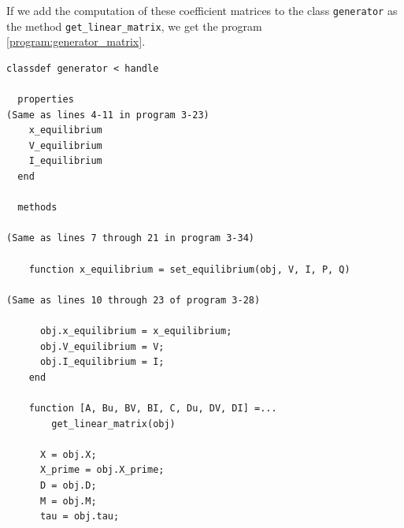 \documentclass[tombow,dvipdfmx]{corona-a5-1.1}
\begin{document}
\begin{例}
If we add the computation of these coefficient matrices to the class \verb|generator| as the method \verb|get_linear_matrix|, we get the program \ref{program:generator_matrix}.

\smallskip
\begin{PROGRAMA}[count,title={generator.m}]\label{program:generator_matrix}
\begin{verbatim}
classdef generator < handle
  
  properties
(Same as lines 4-11 in program 3-23)
    x_equilibrium
    V_equilibrium
    I_equilibrium
  end
  
  methods

(Same as lines 7 through 21 in program 3-34)

    function x_equilibrium = set_equilibrium(obj, V, I, P, Q)

(Same as lines 10 through 23 of program 3-28)

      obj.x_equilibrium = x_equilibrium;
      obj.V_equilibrium = V;
      obj.I_equilibrium = I;
    end
    
    function [A, Bu, BV, BI, C, Du, DV, DI] =...
        get_linear_matrix(obj)
      
      X = obj.X;
      X_prime = obj.X_prime;
      D = obj.D;
      M = obj.M;
      tau = obj.tau;
      

\end{verbatim}
\end{PROGRAMA}
\end{例}
\end{document}
